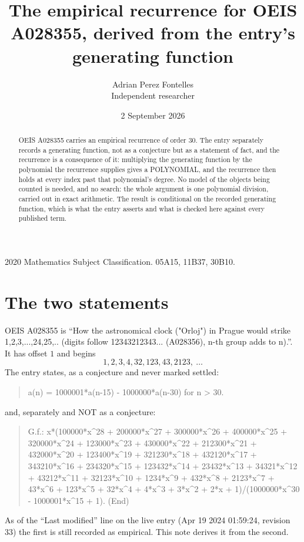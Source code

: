 \documentclass[11pt,a4paper]{article}
\title{The empirical recurrence for OEIS A028355, derived from the entry's generating function}
\author{Adrian Perez Fontelles\\ \small Independent researcher}
\date{2 September 2026}
\theoremstyle{plain}
\theoremstyle{definition}
\begin{document}
\maketitle

\begin{abstract}
OEIS A028355 carries an empirical recurrence of order $30$. The entry separately records a
generating function, not as a conjecture but as a statement of fact, and the recurrence is a
consequence of it: multiplying the generating function by the polynomial the recurrence
supplies gives a POLYNOMIAL, and the recurrence then holds at every index past that
polynomial's degree. No model of the objects being counted is needed, and no search: the
whole argument is one polynomial division, carried out in exact arithmetic. The result is
conditional on the recorded generating function, which is what the entry asserts and what is
checked here against every published term.
\end{abstract}

\noindent\small 2020 Mathematics Subject Classification. 05A15, 11B37, 30B10.\normalsize

\section{The two statements}

OEIS A028355 is ``How the astronomical clock ("Orloj") in Prague would strike 1,2,3,...,24,25,.. (digits follow 12343212343... (A028356), n-th group adds to n).''. It has offset $1$ and begins
\[
1, 2, 3, 4, 32, 123, 43, 2123,\ \dots
\]
The entry states, as a conjecture and never marked settled:
\begin{quote}
a(n) = 1000001*a(n-15) - 1000000*a(n-30) for n > 30.
\end{quote}
and, separately and NOT as a conjecture:
\begin{quote}
G.f.: x*(100000*x\^{}28 + 200000*x\^{}27 + 300000*x\^{}26 + 400000*x\^{}25 + 320000*x\^{}24 + 123000*x\^{}23 + 430000*x\^{}22 + 212300*x\^{}21 + 432000*x\^{}20 + 123400*x\^{}19 + 321230*x\^{}18 + 432120*x\^{}17 + 343210*x\^{}16 + 234320*x\^{}15 + 123432*x\^{}14 + 23432*x\^{}13 + 34321*x\^{}12 + 43212*x\^{}11 + 32123*x\^{}10 + 1234*x\^{}9 + 432*x\^{}8 + 2123*x\^{}7 + 43*x\^{}6 + 123*x\^{}5 + 32*x\^{}4 + 4*x\^{}3 + 3*x\^{}2 + 2*x + 1)/(1000000*x\^{}30 - 1000001*x\^{}15 + 1). (End)
\end{quote}
As of the ``Last modified'' line on the live entry (Apr 19 2024 01:59:24, revision 33) the first is still
recorded as empirical. This note derives it from the second.
\end{document}
